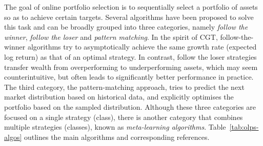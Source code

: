 The goal of online portfolio selection is to sequentially select a portfolio of assets so as to achieve certain targets. Several algorithms have been proposed to solve this task and can be broadly grouped into three categories, namely \emph{follow the winner}, \emph{follow the loser} and \emph{pattern matching}. In the spirit of CGT, follow-the-winner algorithms try to asymptotically achieve the same growth rate (expected log return) as that of an optimal strategy. In contrast, follow the loser strategies transfer wealth from overperforming to underperforming assets, which may seem counterintuitive, but often leads to significantly better performance in practice. The third category, the pattern-matching approach, tries to predict the next market distribution based on historical data, and explicitly optimises the portfolio based on the sampled distribution. Although these three categories are focused on a single strategy (class), there is another category that combines multiple strategies (classes), known as \emph{meta-learning algorithms}. Table~\ref{tab:olps-algos} outlines the main algorithms and corresponding references.
